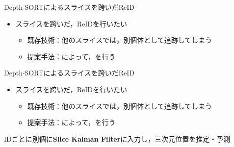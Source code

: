 \begin{frame}[noframenumbering]{Depth-SORTによるスライスを跨いだReID}
    \begin{itemize}
        \item スライスを跨いだ，ReIDを行いたい
        \begin{itemize}
            \item 既存技術：他のスライスでは，別個体として追跡してしまう
            \item[\red{$\blacktriangleright$}] 提案手法：によって，を行う
        \end{itemize}
    \end{itemize}
\end{frame}
\begin{frame}[noframenumbering]{Depth-SORTによるスライスを跨いだReID}
    \begin{itemize}
        \item スライスを跨いだ，ReIDを行いたい
        \begin{itemize}
            \item 既存技術：他のスライスでは，別個体として追跡してしまう
            \item[\red{$\blacktriangleright$}] 提案手法：によって，を行う
        \end{itemize}
    \end{itemize}
    \ra IDごとに別個に\textbf{Slice Kalman Filter}に入力し，三次元位置を推定・予測
\end{frame}

